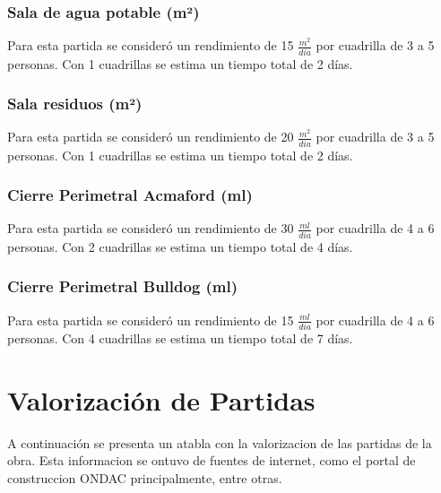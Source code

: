\documentclass{article} %
\begin{document}
\subsubsection{Sala de agua potable (m²)}
Para esta partida se consideró un rendimiento de 15 $\frac{m^2}{dia}$ por cuadrilla de 3 a 5 personas. Con 1 cuadrillas se estima un tiempo total de 2 días.

\subsubsection{Sala residuos (m²)}
Para esta partida se consideró un rendimiento de 20 $\frac{m^2}{dia}$ por cuadrilla de 3 a 5 personas. Con 1 cuadrillas se estima un tiempo total de 2 días.

\subsubsection{Cierre Perimetral Acmaford (ml)}
Para esta partida se consideró un rendimiento de 30 $\frac{ml}{dia}$ por cuadrilla de 4 a 6 personas. Con 2 cuadrillas se estima un tiempo total de 4 días.

\subsubsection{Cierre Perimetral Bulldog (ml)}
Para esta partida se consideró un rendimiento de 15 $\frac{ml}{dia}$ por cuadrilla de 4 a 6 personas. Con 4 cuadrillas se estima un tiempo total de 7 días.

\newpage
\section{Valorización de Partidas}

A continuación se presenta un atabla con la valorizacion de las partidas de la obra. Esta informacion se ontuvo de fuentes de internet, como el portal de construccion ONDAC principalmente, entre otras. 
\end{document}
